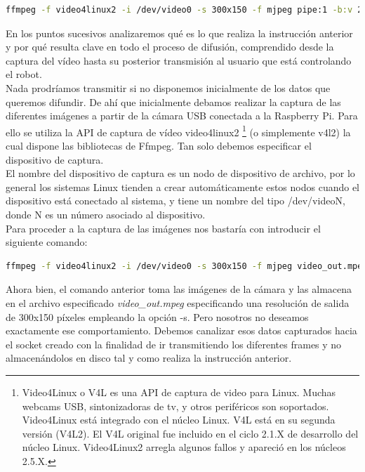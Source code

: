 \begin{lstlisting}[language=bash]
  ffmpeg -f video4linux2 -i /dev/video0 -s 300x150 -f mjpeg pipe:1 -b:v 28k -bufsize 28k
\end{lstlisting}

En los puntos sucesivos analizaremos qué es lo que realiza la instrucción anterior y por qué resulta clave en todo el proceso de difusión, comprendido desde la captura del 
vídeo hasta su posterior transmisión al usuario que está controlando el robot.\\

Nada prodríamos transmitir si no disponemos inicialmente de los datos que queremos difundir. De ahí que inicialmente debamos realizar la captura de las diferentes imágenes a partir de la cámara
USB conectada a la Raspberry Pi. Para ello se utiliza la API de captura de vídeo video4linux2 \footnote{ Video4Linux o V4L es una API de captura de video para Linux. Muchas webcams USB, sintonizadoras
de tv, y otros periféricos son soportados. Video4Linux está integrado con el núcleo Linux. V4L está en su segunda versión (V4L2). El V4L original fue incluido en el ciclo 2.1.X de desarrollo del
núcleo Linux. Video4Linux2 arregla algunos fallos y apareció en los núcleos 2.5.X. } (o simplemente v4l2) la cual dispone las bibliotecas de Ffmpeg. Tan solo debemos especificar el dispositivo de 
captura.\\

El nombre del dispositivo de captura es un nodo de dispositivo de archivo, por lo general los sistemas Linux tienden a crear automáticamente estos nodos cuando el dispositivo
está conectado al sistema, y ​​tiene un nombre del tipo /dev/videoN, donde N es un número asociado al dispositivo.\\ 


Para proceder a la captura de las imágenes nos bastaría con introducir el siguiente comando:

\begin{lstlisting}[language=bash]
  ffmpeg -f video4linux2 -i /dev/video0 -s 300x150 -f mjpeg video_out.mpeg
\end{lstlisting}

Ahora bien, el comando anterior toma las imágenes de la cámara y las almacena en el archivo especificado \emph{ video\_out.mpeg} especificando una resolución de salida de 300x150 píxeles
empleando la opción -s. Pero nosotros no deseamos exactamente ese comportamiento. Debemos canalizar esos datos capturados hacia el socket creado con la finalidad de ir transmitiendo los 
diferentes frames y no almacenándolos en disco tal y como realiza la instrucción anterior.\\


